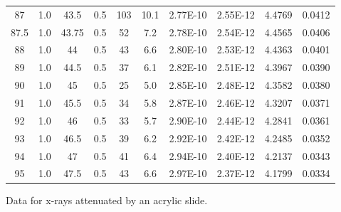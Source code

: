 \begin{maintable}[ht]
\begin{tabular}{cccccccccc}
87        & 1.0 & 43.5     & 0.5         & 103   & 10.1     & 2.77E-10      & 2.55E-12         & 4.4769       & 0.0412 \\
87.5        & 1.0 & 43.75    & 0.5         & 52    & 7.2      & 2.78E-10      & 2.54E-12         & 4.4565       & 0.0406 \\
88        & 1.0 & 44       & 0.5         & 43    & 6.6      & 2.80E-10      & 2.53E-12         & 4.4363       & 0.0401 \\
89        & 1.0 & 44.5     & 0.5         & 37    & 6.1      & 2.82E-10      & 2.51E-12         & 4.3967       & 0.0390 \\
90        & 1.0 & 45       & 0.5         & 25    & 5.0      & 2.85E-10      & 2.48E-12         & 4.3582       & 0.0380 \\
91        & 1.0 & 45.5     & 0.5         & 34    & 5.8      & 2.87E-10      & 2.46E-12         & 4.3207       & 0.0371 \\
92        & 1.0 & 46       & 0.5         & 33    & 5.7      & 2.90E-10      & 2.44E-12         & 4.2841       & 0.0361 \\
93        & 1.0 & 46.5     & 0.5         & 39    & 6.2      & 2.92E-10      & 2.42E-12         & 4.2485       & 0.0352 \\
94        & 1.0 & 47       & 0.5         & 41    & 6.4      & 2.94E-10      & 2.40E-12         & 4.2137       & 0.0343 \\
95        & 1.0 & 47.5     & 0.5         & 43    & 6.6      & 2.97E-10      & 2.37E-12         & 4.1799       & 0.0334 \\

\end{tabular}
\caption{Data for x-rays attenuated by an acrylic slide.}
\label{tab:xrcg5}
\end{maintable}



